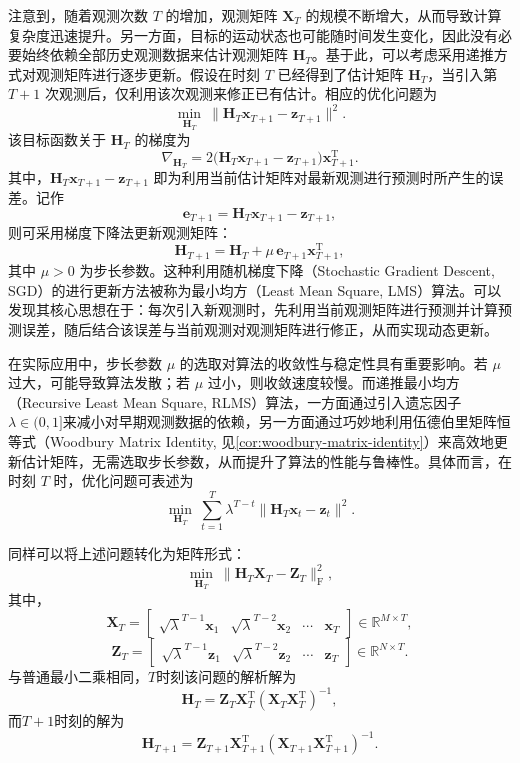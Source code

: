 注意到，随着观测次数 \(T\) 的增加，观测矩阵 \(\mathbf{X}_T\) 的规模不断增大，从而导致计算复杂度迅速提升。另一方面，目标的运动状态也可能随时间发生变化，因此没有必要始终依赖全部历史观测数据来估计观测矩阵 \(\mathbf{H}_T\)。基于此，可以考虑采用递推方式对观测矩阵进行逐步更新。假设在时刻 \(T\) 已经得到了估计矩阵 \(\mathbf{H}_{T}\)，当引入第 \(T+1\) 次观测后，仅利用该次观测来修正已有估计。相应的优化问题为
\[
    \min_{\mathbf{H}_{T}} \ \big\| \mathbf{H}_{T} \bm{x}_{T+1} - \bm{z}_{T+1} \big\|^2.
\]
该目标函数关于 \(\mathbf{H}_{T}\) 的梯度为
\[
    \nabla_{\mathbf{H}_{T}} = 2\big(\mathbf{H}_{T} \bm{x}_{T+1} - \bm{z}_{T+1}\big)\bm{x}_{T+1}^{\mathrm{T}}.
\]
其中，\(\mathbf{H}_{T}\bm{x}_{T+1}-\bm{z}_{T+1}\) 即为利用当前估计矩阵对最新观测进行预测时所产生的误差。记作
\[
    \bm{e}_{T+1} = \mathbf{H}_{T}\bm{x}_{T+1} - \bm{z}_{T+1},
\]
则可采用梯度下降法更新观测矩阵：
\[
    \mathbf{H}_{T+1} = \mathbf{H}_{T} + \mu\, \bm{e}_{T+1}\bm{x}_{T+1}^{\mathrm{T}},
\]
其中 \(\mu > 0\) 为步长参数。这种利用随机梯度下降（Stochastic Gradient Descent, SGD）的进行更新方法被称为最小均方（Least Mean Square, LMS）算法。可以发现其核心思想在于：每次引入新观测时，先利用当前观测矩阵进行预测并计算预测误差，随后结合该误差与当前观测对观测矩阵进行修正，从而实现动态更新。

在实际应用中，步长参数 \(\mu\) 的选取对算法的收敛性与稳定性具有重要影响。若 \(\mu\) 过大，可能导致算法发散；若 \(\mu\) 过小，则收敛速度较慢。而递推最小均方（Recursive Least Mean Square, RLMS）算法，一方面通过引入遗忘因子\( \lambda \in (0,1] \)来减小对早期观测数据的依赖，另一方面通过巧妙地利用伍德伯里矩阵恒等式（Woodbury Matrix Identity, 见\cref{cor:woodbury-matrix-identity}）来高效地更新估计矩阵，无需选取步长参数，从而提升了算法的性能与鲁棒性。具体而言，在时刻 \( T \) 时，优化问题可表述为
\[
    \min_{\mathbf{H}_T} \ \sum_{t=1}^{T} \lambda^{T-t} \big\| \mathbf{H}_T\bm{x}_t - \bm{z}_t \big\|^2.
\]

同样可以将上述问题转化为矩阵形式：
\[
    \min_{\mathbf{H}_T} \ \big\| \mathbf{H}_T \mathbf{X}_T - \mathbf{Z}_T\big\|_{\mathrm{F}}^2,
\]
其中，
\[
    \mathbf{X}_T = \begin{bmatrix} \sqrt{\lambda}^{T-1}\bm{x}_1 & \sqrt{\lambda}^{T-2}\bm{x}_2 & \cdots & \bm{x}_T \end{bmatrix} \in \mathbb{R}^{M \times T},
\]
\[
    \mathbf{Z}_T = \begin{bmatrix} \sqrt{\lambda}^{T-1}\bm{z}_1 & \sqrt{\lambda}^{T-2}\bm{z}_2 & \cdots & \bm{z}_T \end{bmatrix} \in \mathbb{R}^{N \times T}.
\]
与普通最小二乘相同，\( T \)时刻该问题的解析解为
\[
    \mathbf{H}_T = \mathbf{Z}_T \mathbf{X}_T^{\mathrm{T}} \left( \mathbf{X}_T \mathbf{X}_T ^{\mathrm{T}} \right)^{-1},
\]
而\( T + 1 \)时刻的解为
\[
    \mathbf{H}_{T+1} = \mathbf{Z}_{T+1} \mathbf{X}_{T+1}^{\mathrm{T}} \left( \mathbf{X}_{T+1} \mathbf{X}_{T+1} ^{\mathrm{T}} \right)^{-1}.
\]

